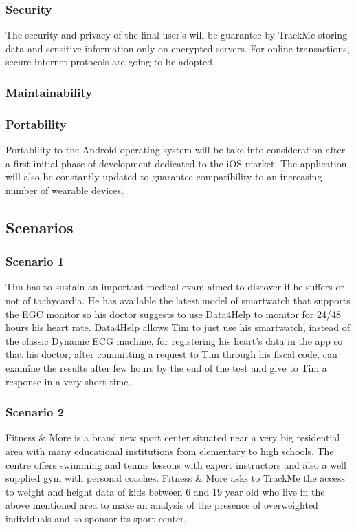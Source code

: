 \documentclass{article}
\begin{document}
	\subsubsection{Security}
	The security and privacy of the final user's will be guarantee by 
	TrackMe storing data and sensitive information only on encrypted 
	servers. \newline
	For online transactions, secure internet protocols are going to
	be adopted. 
	
	\subsubsection{Maintainability}
	
	
	\subsubsection{Portability}
	Portability to the Android operating system will be take into 
	consideration after a first initial phase of development dedicated
	to the iOS market. \newline
	The application will also be constantly updated to guarantee 
	compatibility to an increasing number of wearable devices. 
	
\newpage
\subsection{Scenarios}

	\subsubsection{Scenario 1}
	Tim has to sustain an important medical exam aimed to discover if 
	he suffers or not of tachycardia. He has available the latest 
	model of smartwatch that supports the EGC monitor so his doctor 
	suggests to use Data4Help to monitor for 24/48 hours his heart 
	rate. Data4Help allows Tim to just use his smartwatch, instead of 
	the classic Dynamic ECG machine, for registering his heart’s data 
	in the app so that his doctor, after committing a request to Tim 
	through his fiscal code, can examine the results after few hours 
	by the end of the test and give to Tim a response in a very short 
	time. 

	\subsubsection{Scenario 2}
	Fitness \& More is a brand new sport center situated near a very
	big residential area with many educational institutions from 
	elementary to high schools. The centre offers swimming and tennis
	lessons with expert instructors and also a well supplied gym with
	personal coaches. \newline
	Fitness \& More asks to TrackMe the access to weight and height 
	data of kids between 6 and 19 year old who live in the above 
	mentioned area to make an analysis of the presence of overweighted
	individuals and so sponsor its sport center. 
\end{document}
